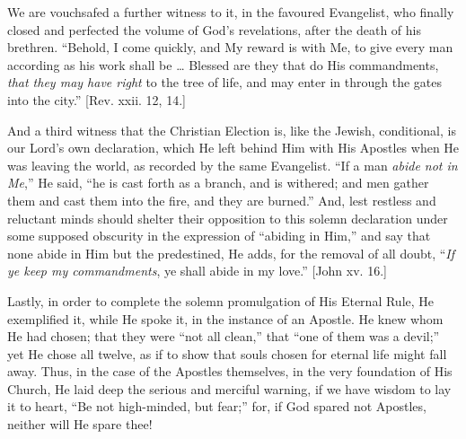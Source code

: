 We are vouchsafed a further witness to it, in the favoured
Evangelist, who finally closed and perfected the volume of God's
revelations, after the death of his brethren. ``Behold, I come
quickly, and My reward is with Me, to give every man according as his
work shall be … Blessed are they that do His commandments, \emph{that
they may have right} to the tree of life, and may enter in through
the gates into the city.'' [Rev. xxii. 12, 14.]

And a third witness that the Christian Election is, like the Jewish,
conditional, is our Lord's own declaration, which He left behind Him
with His Apostles when He was leaving the world, as recorded by the same
Evangelist. ``If a man \emph{abide not in Me},'' He said,
``he is cast forth as a branch, and is withered; and men gather them
and cast them into the fire, and they are burned.'' And, lest
restless and reluctant minds should shelter their opposition to this
solemn declaration under some supposed obscurity in the expression of
``abiding in Him,'' and say that none abide in Him but the
predestined, He adds, for the removal of all doubt, ``\emph{If ye keep
my commandments}, ye shall abide in my love.'' [John xv. 16.]

Lastly, in order to complete the solemn promulgation of His Eternal
Rule, He exemplified it, while He spoke it, in the instance of an
Apostle. He knew whom He had chosen; that they were ``not all
clean,'' that ``one of them was a devil;'' yet He chose all
twelve, as if to show that souls chosen for eternal life might fall
away. Thus, in the case of the Apostles themselves, in the very
foundation of His Church, He laid deep the serious and merciful warning,
if we have wisdom to lay it to heart, ``Be not high-minded, but
fear;'' for, if God spared not Apostles, neither will He spare thee!

